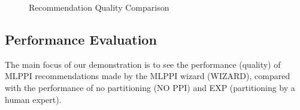 \documentclass[runningheads]{comsis2}
\begin{document}
\begin{figure}[t]
\vspace{-.2in}
\centering
{}
\vspace{-0.1in}
\caption{Recommendation Quality Comparison\label{fig:recomm_qual}}
\vspace{-.1in}
\end{figure}

\subsection{Performance Evaluation}

The main focus of our demonstration is to see the performance (quality) 
of MLPPI recommendations made by the MLPPI wizard (WIZARD), 
compared with the performance of no partitioning (NO PPI) and EXP (partitioning 
by a human expert). 
\end{document}
